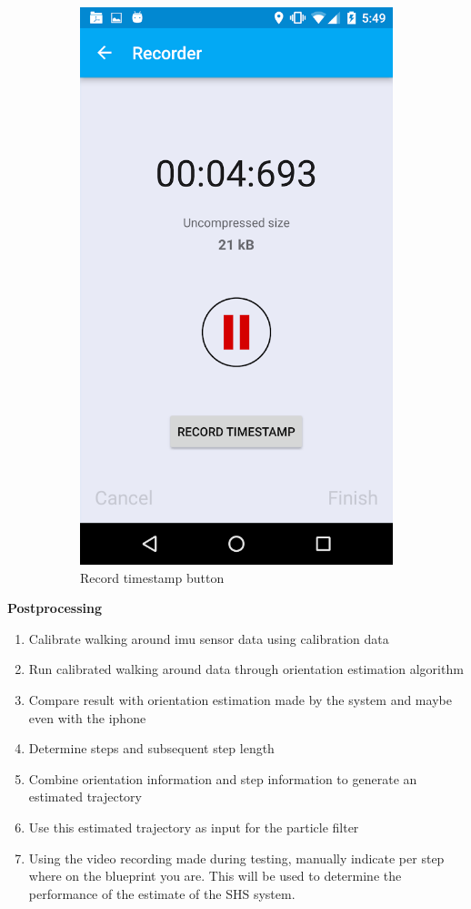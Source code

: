 \begin{figure}[H]
\begin{subfigure}[t]{.45\textwidth}
		\includegraphics[width=0.7\linewidth]{images/recording_timestamp_button}
		\caption{Record timestamp button}
		\label{fig:recording_timestamp_button}
	\end{subfigure}
\caption{}
\end{figure}


\textbf{Postprocessing}

\begin{enumerate}
	\def\labelenumi{\arabic{enumi}.}
	\tightlist
	\item
	Calibrate walking around imu sensor data using calibration data
	\item
	Run calibrated walking around data through orientation estimation
	algorithm
	\item
	Compare result with orientation estimation made by the system and
	maybe even with the iphone 
	\item
	Determine steps and subsequent step length 
	\item
	Combine orientation information and step information to generate an
	estimated trajectory
	\item
	Use this estimated trajectory as input for the particle filter
	\item
	Using the video recording made during testing, manually indicate per
	step where on the blueprint you are. This will be used to determine
	the performance of the estimate of the SHS system. 
\end{enumerate}

